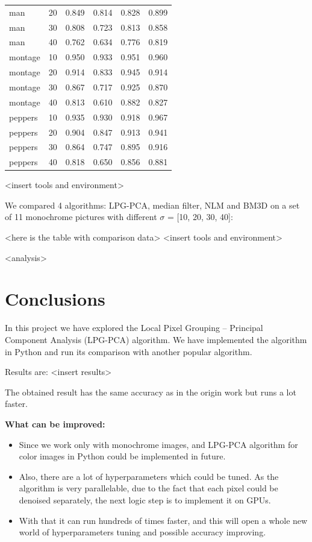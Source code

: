 \begin{tabular}{lrrrrr}
man&20&0.849&0.814&0.828&0.899\\
man&30&0.808&0.723&0.813&0.858\\
man&40&0.762&0.634&0.776&0.819\\
montage&10&0.950&0.933&0.951&0.960\\
montage&20&0.914&0.833&0.945&0.914\\
montage&30&0.867&0.717&0.925&0.870\\
montage&40&0.813&0.610&0.882&0.827\\
peppers&10&0.935&0.930&0.918&0.967\\
peppers&20&0.904&0.847&0.913&0.941\\
peppers&30&0.864&0.747&0.895&0.916\\
peppers&40&0.818&0.650&0.856&0.881\\
\bottomrule
\end{tabular}

<insert tools and environment> 

We compared 4 algorithms: LPG-PCA, median filter, NLM and BM3D on a set of 11 monochrome pictures with different $\sigma$ = [10, 20, 30, 40]: 

<here is the table with comparison data> 
<insert tools and environment> 

<analysis>
\section{Conclusions}
In this project we have explored the Local Pixel Grouping – Principal Component Analysis (LPG-PCA) algorithm. We have implemented the algorithm in Python and run its comparison with another popular algorithm. 

Results are: <insert results> 

The obtained result has the same accuracy as in the origin work but runs a lot faster. 

\textbf{What can be improved:}
\begin{itemize}
    \item Since we work only with monochrome images, and LPG-PCA algorithm for color images in Python could be implemented in future. 
    \item Also, there are a lot of hyperparameters which could be tuned. As the algorithm is very parallelable, due to the fact that each pixel could be denoised separately, the next logic step is to implement it on GPUs. 
    \item With that it can run hundreds of times faster, and this will open a whole new world of hyperparameters tuning and possible accuracy improving.
\end{itemize}

